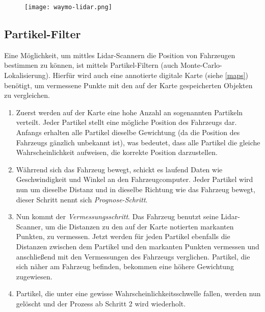 \begin{figure}\centering
  \texttt{[image: waymo-lidar.png]}
  \label{waymo-lidar}
\end{figure}

\subsection{Partikel-Filter}

Eine Möglichkeit, um mittles \acs{Lidar}-Scannern die Position von Fahrzeugen bestimmen zu können, ist mittels Partikel-Filtern (auch Monte-Carlo-Lokalisierung). Hierfür wird auch eine annotierte digitale Karte (siehe \ref{maps}) benötigt, um vermessene Punkte mit den auf der Karte gespeicherten Objekten zu vergleichen.

\begin{enumerate}
  \item{Zuerst werden auf der Karte eine hohe Anzahl an sogenannten Partikeln verteilt. Jeder Partikel stellt eine mögliche Position des Fahrzeugs dar. Anfangs erhalten alle Partikel dieselbe Gewichtung (da die Position des Fahrzeugs gänzlich unbekannt ist), was bedeutet, dass alle Partikel die gleiche Wahrscheinlichkeit aufweisen, die korrekte Position darzustellen.}

  \item{Währrend sich das Fahrzeug bewegt, schickt es laufend Daten wie Geschwindigkeit und Winkel an den Fahrzeugcomputer. Jeder Partikel wird nun um dieselbe Distanz und in dieselbe Richtung wie das Fahrzeug bewegt, dieser Schritt nennt sich \textit{Prognose-Schritt}}.

  \item{Nun kommt der \textit{Vermessungsschritt}. Das Fahrzeug benutzt seine \acs{Lidar}-Scanner}, um die Distanzen zu den auf der Karte notierten markanten Punkten, zu vermessen. Jetzt werden für jeden Partikel ebenfalls die Distanzen zwischen dem Partikel und den markanten Punkten vermessen und anschließend mit den Vermessungen des Fahrzeugs verglichen. Partikel, die sich näher am Fahrzeug befinden, bekommen eine höhere Gewichtung zugewiesen.

  \item{Partikel, die unter eine gewisse Wahrscheinlichkeitsschwelle fallen, werden nun gelöscht und der Prozess ab Schritt 2 wird wiederholt.}
\end{enumerate}

